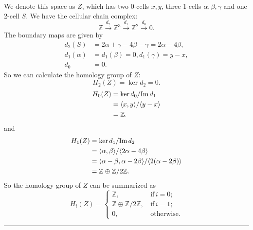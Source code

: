 \documentclass[a4paper, 12pt]{article}
\begin{document}
\begin{solution}
\begin{enumerate}[(a)]
We denote this space as \(Z\), which has two 0-cells \(x,y\), three 1-cells \(\alpha,\beta,\gamma\) and one 2-cell \(S\). We have the cellular chain complex:
\[\mathbb{Z}\xrightarrow{d_2}\mathbb{Z}^3\xrightarrow{d_1}\mathbb{Z}^2\xrightarrow{d_0}0.\]
The boundary maps are given by 
\begin{align*}
    d_2(S)&=2\alpha+\gamma-4\beta-\gamma=2\alpha-4\beta,\\ 
    d_1(\alpha)&=d_1(\beta)=0, d_1(\gamma)=y-x,\\ 
    d_0&=0.
\end{align*}
So we can calculate the homology group of \(Z\):
\[H_2(Z)=\ker d_2=0.\]
\begin{align*}
H_0(Z)&=\ker d_0/\text{Im}\, d_1\\ 
      &=\langle x,y\rangle/\langle y-x\rangle\\ 
      &=\mathbb{Z}. 
\end{align*}
and 
\begin{align*}
H_1(Z)&=\ker d_1/\text{Im}\, d_2\\
      &=\langle \alpha,\beta\rangle/\langle 2\alpha-4\beta\rangle\\ 
      &=\langle \alpha-\beta,\alpha-2\beta\rangle/\langle 2(\alpha-2\beta)\rangle\\ 
      &=\mathbb{Z}\oplus \mathbb{Z}/2 \mathbb{Z}.
\end{align*}
So the homology group of \(Z\) can be summarized as 
\[H_i(Z)=\begin{cases}
    \mathbb{Z},&\, \text{if}\, i=0;\\ 
    \mathbb{Z}\oplus \mathbb{Z}/2 \mathbb{Z},&\, \text{if}\, i=1;\\ 
    0,&\, \text{otherwise}.
\end{cases}\]
\end{enumerate}
\end{solution}

\noindent\rule{7in}{2.8pt}

\newpage
\end{document}
